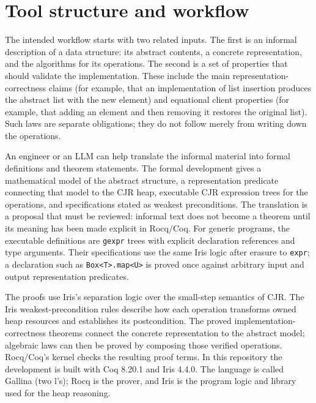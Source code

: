 \documentclass[11pt]{article}
\begin{document}
\section{Tool structure and workflow}
\label{sec:tool-workflow}

The intended workflow starts with two related inputs.  The first is an
informal description of a data structure: its abstract contents, a concrete
representation, and the algorithms for its operations.  The second is a set
of properties that should validate the implementation.  These include the
main representation-correctness claims (for example, that an implementation
of list insertion produces the abstract list with the new element) and
equational client properties (for example, that adding an element and then
removing it restores the original list).  Such laws are separate obligations;
they do not follow merely from writing down the operations.

An engineer or an LLM can help translate the informal material into formal
definitions and theorem statements.  The formal development gives a
mathematical model of the abstract structure, a representation predicate
connecting that model to the CJR heap, executable CJR expression trees for
the operations, and specifications stated as weakest preconditions.  The
translation is a proposal that must be reviewed: informal text does not
become a theorem until its meaning has been made explicit in Rocq/Coq.
For generic programs, the executable definitions are \texttt{gexpr} trees
with explicit declaration references and type arguments. Their specifications
use the same Iris logic after erasure to \texttt{expr}; a declaration such as
\texttt{Box<T>.map<U>} is proved once against arbitrary input and output
representation predicates.

The proofs use Iris's separation logic over the small-step semantics of CJR.
The Iris weakest-precondition rules describe how each operation transforms
owned heap resources and establishes its postcondition.  The proved
implementation-correctness theorems connect the concrete representation to
the abstract model; algebraic laws can then be proved by composing those
verified operations.  Rocq/Coq's kernel checks the resulting proof terms.
In this repository the development is built with Coq 8.20.1 and Iris 4.4.0.
The language is called Gallina (two l's); Rocq is the prover, and Iris is the
program logic and library used for the heap reasoning.
\end{document}
